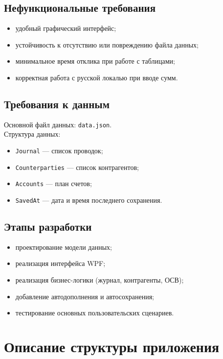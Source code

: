 \documentclass[14pt,a4paper]{extarticle}
\begin{document}
\subsection{Нефункциональные требования}
\begin{itemize}
    \item удобный графический интерфейс;
    \item устойчивость к отсутствию или повреждению файла данных;
    \item минимальное время отклика при работе с таблицами;
    \item корректная работа с русской локалью при вводе сумм.
\end{itemize}

\subsection{Требования к данным}
Основной файл данных: \texttt{data.json}.\\
Структура данных:
\begin{itemize}
    \item \texttt{Journal} --- список проводок;
    \item \texttt{Counterparties} --- список контрагентов;
    \item \texttt{Accounts} --- план счетов;
    \item \texttt{SavedAt} --- дата и время последнего сохранения.
\end{itemize}

\subsection{Этапы разработки}
\begin{itemize}
    \item проектирование модели данных;
    \item реализация интерфейса WPF;
    \item реализация бизнес-логики (журнал, контрагенты, ОСВ);
    \item добавление автодополнения и автосохранения;
    \item тестирование основных пользовательских сценариев.
\end{itemize}

\section{Описание структуры приложения}
\end{document}
